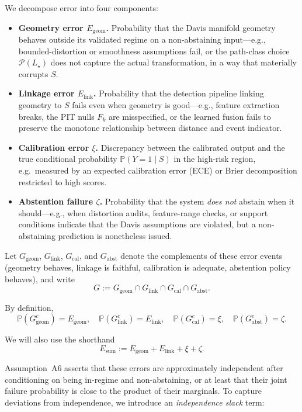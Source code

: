 \documentclass[11pt]{article}
\newcommand{\Prob}{\mathbb{P}}
\begin{document}
We decompose error into four components:
\begin{itemize}[leftmargin=2em]
  \item \textbf{Geometry error $E_{\mathrm{geom}}$.}
    Probability that the Davis manifold geometry behaves outside its validated regime on a
    non-abstaining input—e.g., bounded-distortion or smoothness assumptions fail, or the
    path-class choice $\mathcal{P}(L_\star)$ does not capture the actual transformation, in
    a way that materially corrupts $S$.

  \item \textbf{Linkage error $E_{\mathrm{link}}$.}
    Probability that the detection pipeline linking geometry to $S$ fails even when geometry
    is good—e.g., feature extraction breaks, the PIT nulls $F_k$ are misspecified, or the
    learned fusion fails to preserve the monotone relationship between distance and event
    indicator.

  \item \textbf{Calibration error $\xi$.}
    Discrepancy between the calibrated output and the true conditional probability
    $\Prob(Y=1 \mid S)$ in the high-risk region, e.g.\ measured by an expected calibration
    error (ECE) or Brier decomposition restricted to high scores.

  \item \textbf{Abstention failure $\zeta$.}
    Probability that the system \emph{does not} abstain when it should—e.g., when distortion
    audits, feature-range checks, or support conditions indicate that the Davis assumptions
    are violated, but a non-abstaining prediction is nonetheless issued.
\end{itemize}

Let $G_{\mathrm{geom}}$, $G_{\mathrm{link}}$, $G_{\mathrm{cal}}$, and $G_{\mathrm{abst}}$ denote the complements of
these error events (geometry behaves, linkage is faithful, calibration is adequate, abstention policy
behaves), and write
\[
G := G_{\mathrm{geom}} \cap G_{\mathrm{link}} \cap G_{\mathrm{cal}} \cap G_{\mathrm{abst}}.
\]

By definition,
\[
\Prob(G_{\mathrm{geom}}^c) = E_{\mathrm{geom}},\quad
\Prob(G_{\mathrm{link}}^c) = E_{\mathrm{link}},\quad
\Prob(G_{\mathrm{cal}}^c) = \xi,\quad
\Prob(G_{\mathrm{abst}}^c) = \zeta.
\]

We will also use the shorthand
\[
E_{\mathrm{sum}} := E_{\mathrm{geom}} + E_{\mathrm{link}} + \xi + \zeta.
\]

Assumption~A6 asserts that these errors are approximately independent after conditioning on
being in-regime and non-abstaining, or at least that their joint failure probability is close to the
product of their marginals. To capture deviations from independence, we introduce an
\emph{independence slack} term:
\end{document}
